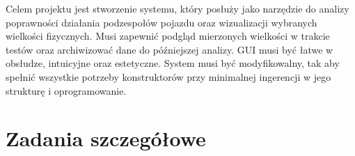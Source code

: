 Celem projektu jest stworzenie systemu, który posłuży jako narzędzie do analizy poprawności działania podzespołów pojazdu oraz wizualizacji wybranych wielkości fizycznych. Musi zapewnić podgląd mierzonych wielkości w trakcie testów oraz archiwizować dane do późniejszej analizy. GUI musi być łatwe w obsłudze, intuicyjne oraz estetyczne. System musi być modyfikowalny, tak aby spełnić wszystkie potrzeby konstruktorów przy minimalnej ingerencji w jego strukturę i oprogramowanie.

\section{Zadania szczegółowe}


